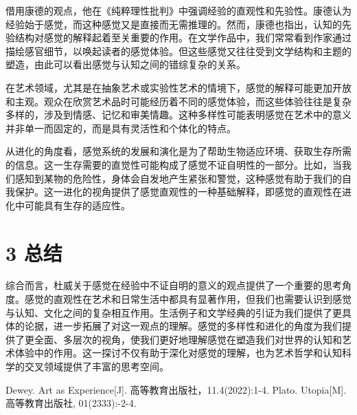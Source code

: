 \documentclass[twocolumn]{ctexart}
\begin{document}
	借用康德的观点，他在《纯粹理性批判》中强调经验的直观性和先验性。康德认为经验始于感觉，而这种感觉又是直接而无需推理的。然而，康德也指出，认知的先验结构对感觉的解释起着至关重要的作用。在文学作品中，我们常常看到作家通过描绘感官细节，以唤起读者的感觉体验。但这些感觉又往往受到文学结构和主题的塑造，由此可以看出感觉与认知之间的错综复杂的关系。
	
	在艺术领域，尤其是在抽象艺术或实验性艺术的情境下，感觉的解释可能更加开放和主观。观众在欣赏艺术品时可能经历着不同的感觉体验，而这些体验往往是复杂多样的，涉及到情感、记忆和审美情趣。这种多样性可能表明感觉在艺术中的意义并非单一而固定的，而是具有灵活性和个体化的特点。
	
	从进化的角度看，感觉系统的发展和演化是为了帮助生物适应环境、获取生存所需的信息。这一生存需要的直觉性可能构成了感觉不证自明性的一部分。比如，当我们感知到某物的危险性，身体会自发地产生紧张和警觉，这种感觉有助于我们的自我保护。这一进化的视角提供了感觉直观性的一种基础解释，即感觉的直观性在进化中可能具有生存的适应性。
	
	
	
	
	\section*{3 总结}
	
	综合而言，杜威关于感觉在经验中不证自明的意义的观点提供了一个重要的思考角度。感觉的直观性在艺术和日常生活中都具有显著作用，但我们也需要认识到感觉与认知、文化之间的复杂相互作用。生活例子和文学经典的引证为我们提供了更具体的论据，进一步拓展了对这一观点的理解。感觉的多样性和进化的角度为我们提供了更全面、多层次的视角，使我们更好地理解感觉在塑造我们对世界的认知和艺术体验中的作用。这一探讨不仅有助于深化对感觉的理解，也为艺术哲学和认知科学的交叉领域提供了丰富的思考空间。
	
	
	
	
	
	\begin{thebibliography}{99}%
		Dewey. Art as Experience[J]. 高等教育出版社，11.4(2022):1-4.
		Plato. Utopia[M]. 高等教育出版社, 01(2333):-2-4.
	\end{thebibliography}
\end{document}
